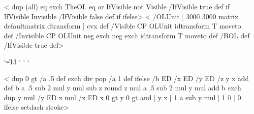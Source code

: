 \def\overlaybox{%
  \global\setbox\theoverlaybox=\hbox\bgroup
    \begingroup
    \let\psoverlay\pst@overlay
    \def\overlaybox{%
      \@pstrickserr{Overlays cannot be nested}\@eha}%
    \def\putoverlaybox{%
      \@pstrickserr{You must end the overlay box
      before using \string\putoverlaybox}}%
    \psoverlay{main}%
    \ignorespaces}

<%
  dup (all) eq exch TheOL eq or
  { IfVisible not { Visible /IfVisible true def } if }
  { IfVisible { Invisible /IfVisible false def } if }
  ifelse>
<%
  /OLUnit [ 3000 3000 matrix defaultmatrix dtransform ] cvx def
  /Visible { CP OLUnit idtransform T moveto } def
  /Invisible { CP OLUnit neg exch neg exch idtransform T moveto } def
  /BOL { \tx@BeginOL } def /IfVisible true def>
\def\AltOverlayMode{%
  \def\pst@initoverlay##1{%
    \pst@Verb{%
      \tx@InitOL
      /Visible { initclip } def
      /Invisible {
        CP newpath OLUnit itransform moveto clip newpath moveto
      } def
      /TheOL (##1) def}}}

\def\SpecialCoor{%
  \def\pst@@getcoor##1{%
    \begingroup
      \pst@activecoor
      \xdef\pst@tempg{##1}%
    \endgroup
    \expandafter\special@coor\pst@tempg||\@nil}%
  \def\pst@@getangle##1{%
    \begingroup
      \pst@activecoor
      \xdef\pst@tempg{##1}%
    \endgroup
    \expandafter\special@angle\pst@tempg\@empty)\@nil}%
  \def\psput@##1{\pst@@getcoor{##1}\leavevmode\psput@special}}
\begingroup
  \catcode`\|=13
  \catcode`
  \catcode`
  \gdef\pst@activecoor{%
    \def|{\string|}%
    \def;{\string;}%
    \def!{\string!}}
\endgroup
\begingroup
  \catcode`
  \gdef\pst@activerot{\def:{\string:}}
\endgroup
\def\psset@nrot#1{%
  \begingroup
    \pst@activerot
    \pst@expandafter{\@ifnextchar:{\psset@@nrot}{\psset@@rot}}{#1}\@nil
    \global\let\pst@tempg\psk@rot
  \endgroup
  \let\psk@nrot\pst@tempg}


<%
  dup 0 gt
  { /a .5 def \tx@PathLength exch div }
  { pop /a 1 def \tx@PathLength }
  ifelse
  /b ED             %
  /x ED             %
  /y ED             %
  /z y x add def    %
  b a .5 sub 2 mul y mul sub z \tx@Div round
  z mul a .5 sub 2 mul y mul add b exch \tx@Div dup
  y mul /y ED x mul /x ED
  x 0 gt y 0 gt and
  { [ y x ] 1 a sub y mul }
  { [ 1 0 ] 0 }
  ifelse
  setdash
  stroke>

